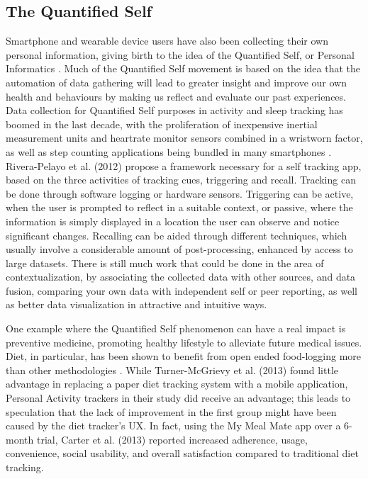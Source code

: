 \subsection{The Quantified Self}
Smartphone and wearable device users have also been collecting their own personal information, giving birth to the idea of the Quantified Self, or Personal Informatics \cite{rapp2014}.
Much of the Quantified Self movement is based on the idea that the automation of data gathering will lead to greater insight and improve our own health and behaviours by making us reflect and evaluate our past experiences. Data collection for Quantified Self purposes in activity and sleep tracking has boomed in the last decade, with the proliferation of inexpensive inertial measurement units and heartrate monitor sensors combined in a wristworn factor, as well as step counting applications being bundled in many smartphones \cite{Crawford2015}.\\
Rivera-Pelayo et al. (2012)\cite{Rivera-Pelayo2012} propose a framework necessary for a self tracking app, based on the three activities of tracking cues, triggering and recall.
Tracking can be done through software logging or hardware sensors. Triggering can be active, when the user is prompted to reflect in a suitable context, or passive, where the information is simply displayed in a location the user can observe and notice significant changes. Recalling can be aided through different techniques, which usually involve a considerable amount of post-processing, enhanced by access to large datasets. There is still much work that could be done in the area of contextualization, by associating the collected data with other sources, and data fusion, comparing your own data with independent self or peer reporting, as well as better data visualization in attractive and intuitive ways.

One example where the Quantified Self phenomenon can have a real impact is preventive medicine, promoting healthy lifestyle to alleviate future medical issues. Diet, in particular, has been shown to benefit from open ended food-logging more than other methodologies \cite{Bingham1994}. While Turner-McGrievy et al. (2013)\cite{Turner-McGrievy2013} found little advantage in replacing a paper diet tracking system with a mobile application, Personal Activity trackers in their study did receive an advantage; this leads to speculation that the lack of improvement in the first group might have been caused by the diet tracker's UX. In fact, using the My Meal Mate app over a 6-month trial, Carter et al. (2013)\cite{carter2013adherence} reported increased adherence, usage, convenience, social usability, and overall satisfaction compared to traditional diet tracking. 

